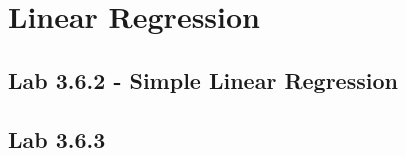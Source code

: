 \chapter{Linear Regression}
\label{chp:linreg}

\section{Lab 3.6.2 - Simple Linear Regression}



\section{Lab 3.6.3}
